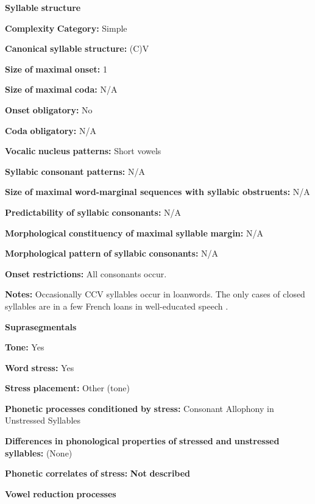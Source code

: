 \textbf{Syllable} \textbf{structure}

\textbf{Complexity} \textbf{Category:} Simple

\textbf{Canonical} \textbf{syllable} \textbf{structure:} (C)V \citep[112-114]{Morse1976}

\textbf{Size} \textbf{of} \textbf{maximal} \textbf{onset:} 1

\textbf{Size} \textbf{of} \textbf{maximal} \textbf{coda:} N/A

\textbf{Onset} \textbf{obligatory:} No

\textbf{Coda} \textbf{obligatory:} N/A

\textbf{Vocalic} \textbf{nucleus} \textbf{patterns:} Short vowels

\textbf{Syllabic} \textbf{consonant} \textbf{patterns:} N/A

\textbf{Size} \textbf{of} \textbf{maximal} \textbf{word{}-marginal sequences with syllabic obstruents:} N/A

\textbf{Predictability} \textbf{of} \textbf{syllabic} \textbf{consonants:} N/A

\textbf{Morphological} \textbf{constituency} \textbf{of} \textbf{maximal} \textbf{syllable} \textbf{margin:} N/A

\textbf{Morphological} \textbf{pattern} \textbf{of} \textbf{syllabic} \textbf{consonants:} N/A

\textbf{Onset} \textbf{restrictions:} All consonants occur.

\textbf{Notes:} Occasionally CCV syllables occur in loanwords. The only cases of closed syllables are in a few French loans in well-educated speech \citep[113]{Morse1976}.

\textbf{Suprasegmentals}

\textbf{Tone:} Yes

\textbf{Word} \textbf{stress:} Yes

\textbf{Stress} \textbf{placement:} Other (tone)

\textbf{Phonetic} \textbf{processes} \textbf{conditioned} \textbf{by} \textbf{stress:} Consonant Allophony in Unstressed Syllables

\textbf{Differences} \textbf{in} \textbf{phonological} \textbf{properties} \textbf{of} \textbf{stressed} \textbf{and} \textbf{unstressed} \textbf{syllables:} (None)

\textbf{Phonetic} \textbf{correlates} \textbf{of} \textbf{stress:} \textbf{Not} \textbf{described}

\textbf{Vowel} \textbf{reduction} \textbf{processes}

